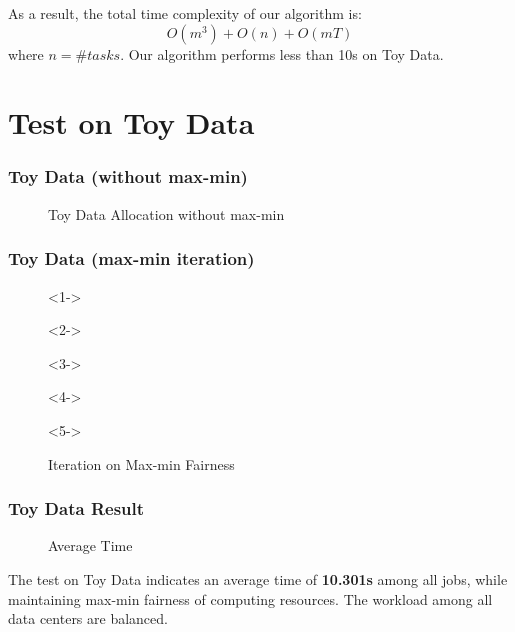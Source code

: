 \begin{frame}
    As a result, the total time complexity of our algorithm is:
\begin{equation*}
    O(m^3)+O(n)+O(mT)
\end{equation*}
where $n=\#tasks$. Our algorithm performs less than 10s on Toy Data.
\end{frame}

\section{Test on Toy Data}

\begin{frame}
\frametitle{Toy Data (without max-min)}
    \begin{figure}[h]
    \centering
    
    \caption{Toy Data Allocation without max-min} %
\end{figure}
\end{frame}

\begin{frame}
\frametitle{Toy Data (max-min iteration)}
    \begin{figure}[h]
        \centering
        \begin{actionenv}<1->
            
        \end{actionenv}
        \begin{actionenv}<2->
            
        \end{actionenv}
        \begin{actionenv}<3->
            
        \end{actionenv}
        \begin{actionenv}<4->
            
        \end{actionenv}
        \begin{actionenv}<5->
            
        \end{actionenv}
        \caption{Iteration on Max-min Fairness}
    \end{figure}
\end{frame}

\begin{frame}
\frametitle{Toy Data Result}
    \begin{figure}
        \centering
        
        \caption{Average Time}
    \end{figure}
    The test on Toy Data indicates an average time of \textbf{10.301s} among all jobs, while maintaining max-min fairness of computing resources. The workload among all data centers are balanced.
\end{frame}

